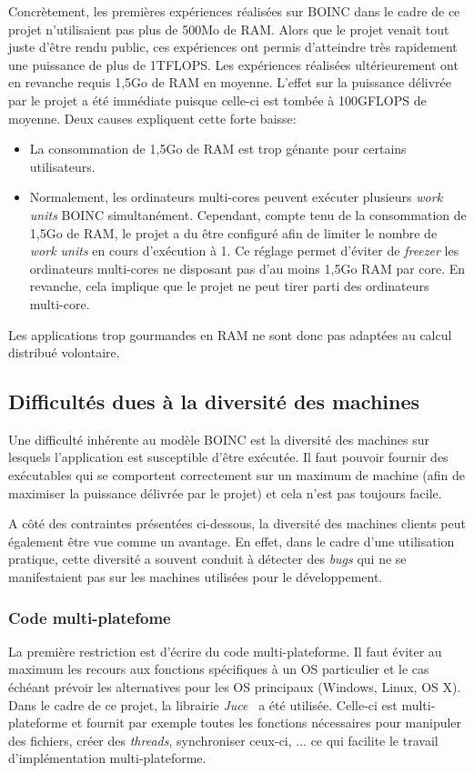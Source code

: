 \documentclass[a4paper, 11pt]{report}
\begin{document}
Concrètement, les premières expériences réalisées sur \textsc{BOINC} dans le cadre de ce projet n'utilisaient pas plus de 500Mo de RAM. Alors que le projet venait tout juste d'être rendu public, ces expériences ont permis d'atteindre très rapidement une puissance de plus de 1TFLOPS. Les expériences réalisées ultérieurement ont en revanche requis 1,5Go de RAM en moyenne. L'effet sur la puissance délivrée par le projet a été immédiate puisque celle-ci est tombée à 100GFLOPS de moyenne. Deux causes expliquent cette forte baisse:
\begin{itemize}
\item La consommation de 1,5Go de RAM est trop génante pour certains utilisateurs.
\item Normalement, les ordinateurs multi-cores peuvent exécuter plusieurs \textit{work units} \textsc{BOINC} simultanément. Cependant, compte tenu de la consommation de 1,5Go de RAM, le projet a du être configuré afin de limiter le nombre de \textit{work units} en cours d'exécution à 1. Ce réglage permet d'éviter de \textit{freezer} les ordinateurs multi-cores ne disposant pas d'au moins 1,5Go RAM par core. En revanche, cela implique que le projet ne peut tirer parti des ordinateurs multi-core.
\end{itemize}

Les applications trop gourmandes en RAM ne sont donc pas adaptées au calcul distribué volontaire.

\subsection{Difficultés dues à la diversité des machines}
Une difficulté inhérente au modèle \textsc{BOINC} est la diversité des machines sur lesquels l'application est susceptible d'être exécutée. Il faut pouvoir fournir des exécutables qui se comportent correctement sur un maximum de machine (afin de maximiser la puissance délivrée par le projet) et cela n'est pas toujours facile.

A côté des contraintes présentées ci-dessous, la diversité des machines clients peut également être vue comme un avantage. En effet, dans le cadre d'une utilisation pratique, cette diversité a souvent conduit à détecter des \textit{bugs} qui ne se manifestaient pas sur les machines utilisées pour le développement.

\subsubsection{Code multi-platefome}
La première restriction est d'écrire du code multi-plateforme. Il faut éviter au maximum les recours aux fonctions spécifiques à un OS particulier et le cas échéant prévoir les alternatives pour les OS principaux (Windows, Linux, OS X). Dans le cadre de ce projet, la librairie \textit{Juce}~\cite{JUCE} a été utilisée. Celle-ci est multi-plateforme et fournit par exemple toutes les fonctions nécessaires pour manipuler des fichiers, créer des \textit{threads},  synchroniser ceux-ci, ... ce qui facilite le travail d'implémentation multi-plateforme. 
\end{document}
